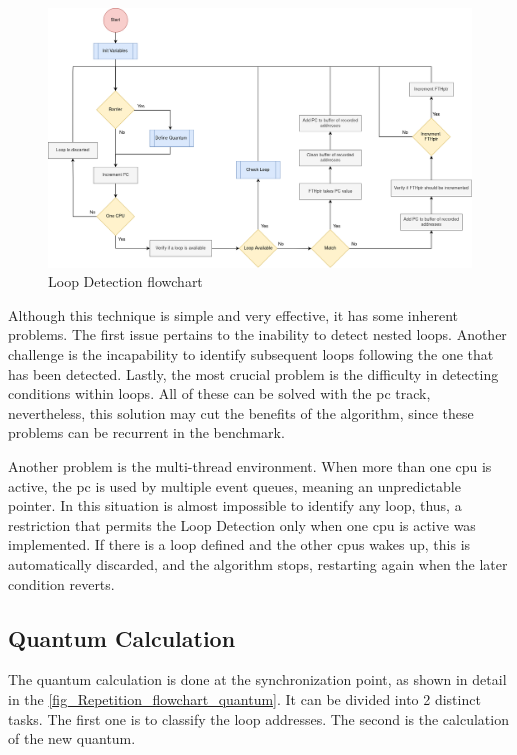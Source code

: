 \begin{figure}[h!]
	\centering
 	\includegraphics[width=0.9\linewidth]{Images/Repetition_flowchart.png}
 	\caption{Loop Detection flowchart}
	 \label{fig_Repetition_flowchart}
\end{figure}


Although this technique is simple and very effective, it has some inherent problems. The first issue pertains to the inability to detect 
nested loops. Another challenge is the incapability to identify subsequent loops following the one that has been detected. Lastly, the most crucial 
problem is the difficulty in detecting conditions within loops. All of these can be solved with the \gls{pc} track, nevertheless, this solution 
may cut the benefits of the algorithm, since these problems can be recurrent in the benchmark. 

Another problem is the multi-thread environment. When more than one \gls{cpu} is active, the \gls{pc} is used by multiple event queues, 
meaning an unpredictable pointer. In this situation is almost impossible to identify any loop, thus, a restriction that permits the Loop 
Detection only when one \gls{cpu} is active was implemented.   
If there is a loop defined and the other \glspl{cpu} wakes up, this is automatically discarded, and the algorithm 
stops, restarting again when the later condition reverts. 

\subsection{Quantum Calculation}

The quantum calculation is done at the synchronization point, as shown in detail in the \autoref{fig_Repetition_flowchart_quantum}. 
It can be divided into 2 distinct tasks. The first one is to classify the loop addresses. The second is the calculation of the new quantum. 

